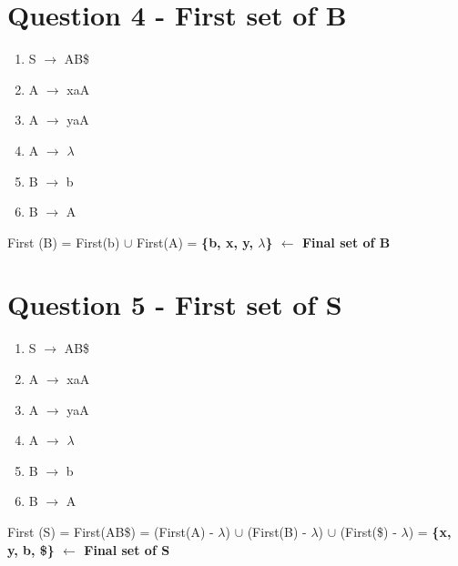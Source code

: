 \documentclass{report}
\begin{document}
\section{Question 4 - First set of B}
\vspace{-1em}
\begin{multicols}{2}
  \begin{enumerate}
    \setlength\itemsep{-.25em}
    \item S $\rightarrow$ AB\$
    \item A $\rightarrow$ xaA
    \item A $\rightarrow$ yaA
    \item A $\rightarrow$ $\lambda$
    \item B $\rightarrow$ b
    \item B $\rightarrow$ A\newline
  \end{enumerate}
\setlength{\leftskip}{-12em}
First (B) = First(b) $\cup$  First(A) = \textbf{\{b, x, y, $\lambda$\}  $\leftarrow$ Final set of B}\newline
\newline\newline\newline\newline
\end{multicols}

\vspace{-3em}
\section{Question 5 - First set of S}
\vspace{-1em}
\begin{multicols}{2}
  \begin{enumerate}
    \setlength\itemsep{-.25em}
    \item S $\rightarrow$ AB\$
    \item A $\rightarrow$ xaA
    \item A $\rightarrow$ yaA
    \item A $\rightarrow$ $\lambda$
    \item B $\rightarrow$ b
    \item B $\rightarrow$ A
  \end{enumerate}
\setlength{\leftskip}{-12em}
First (S) = First(AB\$) = (First(A) - $\lambda$) $\cup$ (First(B) - $\lambda$) $\cup$ (First(\$) - $\lambda$)\newline
\indent\hspace{.75cm} = \textbf{\{x, y, b, \$\} $\leftarrow$ Final set of S}
\newline\newline\newline
\end{multicols}
\end{document}
